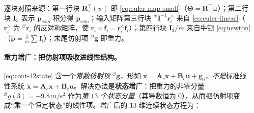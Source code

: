 逐块对照来源：第一行块 $\mathbf{R}_z^\top(\psi)$ 即 \cref{eq:euler-map-small}（$\dot{\boldsymbol{\Theta}}=\mathbf{R}_z^\top\boldsymbol{\omega}$）；第二行块 $\mathbf{I}_3$ 表示 $\dot{\boldsymbol{p}}_{com}$ 积分得 $\boldsymbol{p}_{com}$；输入矩阵第三行块 ${}^{\mathcal{P}}\mathbf{I}^{-1}\boldsymbol{r}_i^{\wedge}$ 来自 \cref{eq:euler-linear}（$\boldsymbol{r}_i^{\wedge}$ 为 ${}^{\mathcal{O}}\boldsymbol{r}_i$ 的反对称矩阵，使 $\boldsymbol{r}_i\times\boldsymbol{f}_i=\boldsymbol{r}_i^{\wedge}\boldsymbol{f}_i$）；第四行块 $\mathbf{I}_3/m$ 来自牛顿 \cref{eq:newton}（$\ddot{\boldsymbol{p}}=\tfrac1m\sum\boldsymbol{f}_i$）；末尾仿射项 ${}^{\mathcal{O}}\boldsymbol{g}$ 即重力。

\paragraph{重力增广：把仿射项吸收进线性结构。}
\cref{eq:cont-12state} 含一个\emph{常数仿射项} ${}^{\mathcal{O}}\boldsymbol{g}$，形如 $\dot{\boldsymbol{x}}=\mathbf{A}_c\boldsymbol{x}+\mathbf{B}_c\boldsymbol{u}+\mathbf{g}_0$，\emph{不是}标准线性系统 $\dot{\boldsymbol{x}}=\mathbf{A}_c\boldsymbol{x}+\mathbf{B}_c\boldsymbol{u}$。解决办法是\textbf{状态增广}：把重力的非零分量 ${}^{\mathcal{O}}g(3)=-9.8\,\mathrm{m/s^2}$ 作为\emph{第 $13$ 个状态分量}（其导数恒为 $0$），从而把仿射项变成“乘一个恒定状态”的线性项。增广后的 $13$ 维连续状态方程为\cite{dicarlo2018cheetah,yu2021quadruped}：
